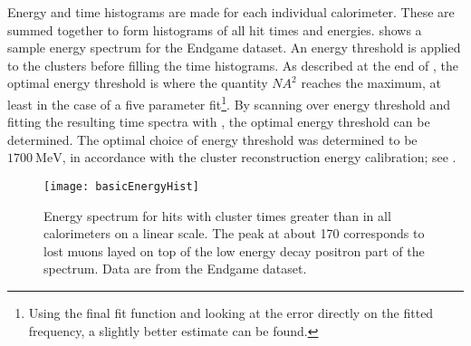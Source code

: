 Energy and time histograms are made for each individual calorimeter. These are summed together to form histograms of all hit times and energies.  shows a sample energy spectrum for the Endgame dataset. An energy threshold is applied to the clusters before filling the time histograms. As described at the end of , the optimal energy threshold is where the quantity $NA^{2}$ reaches the maximum, at least in the case of a five parameter fit\footnote{Using the final fit function and looking at the error directly on the fitted \wa frequency, a slightly better estimate can be found.}. By scanning over energy threshold and fitting the resulting time spectra with , the optimal energy threshold can be determined. The optimal choice of energy threshold was determined to be $\SI{1700}{\MeV}$, in accordance with the cluster reconstruction energy calibration; see . 

\begin{figure}[h]
    \centering
    \texttt{[image: basicEnergyHist]}
    \caption[Sample energy spectrum]{Energy spectrum for hits with cluster times greater than  in all calorimeters on a linear scale. The peak at about 170 \MeV corresponds to lost muons layed on top of the low energy decay positron part of the spectrum. Data are from the Endgame dataset.}
    \label{fig:energyHist}
\end{figure}


